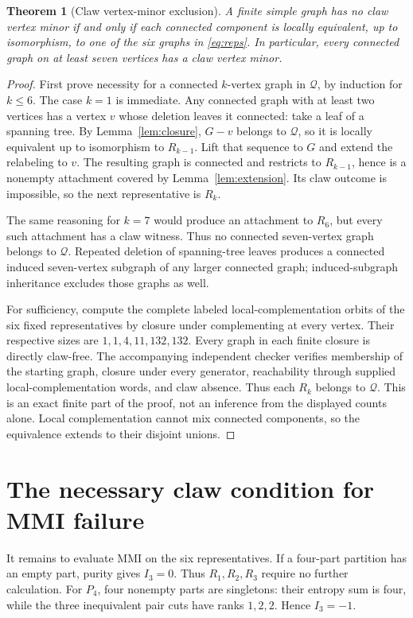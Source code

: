 \documentclass[11pt,letterpaper]{article}
\newtheorem{theorem}{Theorem}
\newcommand{\Ithree}{I_3}
\begin{document}
\begin{theorem}[Claw vertex-minor exclusion]\label{thm:class}
A finite simple graph has no claw vertex minor if and only if each connected component is locally equivalent, up to isomorphism, to one of the six graphs in \eqref{eq:reps}. In particular, every connected graph on at least seven vertices has a claw vertex minor.
\end{theorem}
\begin{proof}
First prove necessity for a connected $k$-vertex graph in $\mathcal Q$, by induction for $k\leq6$. The case $k=1$ is immediate. Any connected graph with at least two vertices has a vertex $v$ whose deletion leaves it connected: take a leaf of a spanning tree. By Lemma~\ref{lem:closure}, $G-v$ belongs to $\mathcal Q$, so it is locally equivalent up to isomorphism to $R_{k-1}$. Lift that sequence to $G$ and extend the relabeling to $v$. The resulting graph is connected and restricts to $R_{k-1}$, hence is a nonempty attachment covered by Lemma~\ref{lem:extension}. Its claw outcome is impossible, so the next representative is $R_k$.

The same reasoning for $k=7$ would produce an attachment to $R_6$, but every such attachment has a claw witness. Thus no connected seven-vertex graph belongs to $\mathcal Q$. Repeated deletion of spanning-tree leaves produces a connected induced seven-vertex subgraph of any larger connected graph; induced-subgraph inheritance excludes those graphs as well.

For sufficiency, compute the complete labeled local-complementation orbits of the six fixed representatives by closure under complementing at every vertex. Their respective sizes are $1,1,4,11,132,132$. Every graph in each finite closure is directly claw-free. The accompanying independent checker verifies membership of the starting graph, closure under every generator, reachability through supplied local-complementation words, and claw absence. Thus each $R_k$ belongs to $\mathcal Q$. This is an exact finite part of the proof, not an inference from the displayed counts alone. Local complementation cannot mix connected components, so the equivalence extends to their disjoint unions.
\end{proof}

\section{The necessary claw condition for MMI failure}\label{sec:claw-mmi}
It remains to evaluate MMI on the six representatives. If a four-part partition has an empty part, purity gives $\Ithree=0$. Thus $R_1,R_2,R_3$ require no further calculation. For $P_4$, four nonempty parts are singletons: their entropy sum is four, while the three inequivalent pair cuts have ranks $1,2,2$. Hence $\Ithree=-1$.
\end{document}
